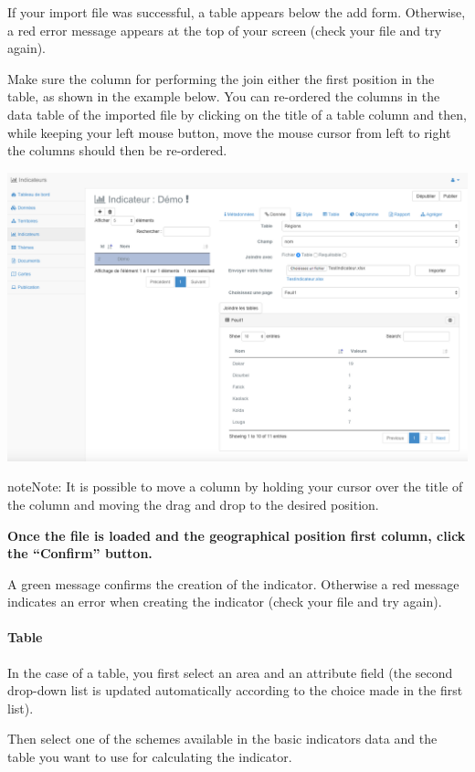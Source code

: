 \documentclass[letterpaper,10pt,english]{sphinxmanual}
\begin{document}
If your import file was successful, a table appears below the add form. Otherwise, a red error message appears at the top of your screen (check your file and try again).

Make sure the column for performing the join either the first position in the table, as shown in the example below. You can re-ordered the columns in the data table of the imported file by clicking on the title of a table column and then, while keeping your left mouse button, move the mouse cursor from left to right the columns should then be re-ordered.

\includegraphics[width=1.000\linewidth]{indicator-data-table.png}

\begin{notice}{note}{Note:}
It is possible to move a column by holding your cursor over the title of the column and moving the drag and drop to the desired position.
\end{notice}

\textbf{Once the file is loaded and the geographical position first column, click the ``Confirm'' button.}

A green message confirms the creation of the indicator. Otherwise a red message indicates an error when creating the indicator (check your file and try again).


\paragraph{Table}
\label{indicators/indicatorspanel:table}
In the case of a table, you first select an area and an attribute field (the second drop-down list is updated automatically according to the choice made in the first list).

Then select one of the schemes available in the basic indicators data and the table you want to use for calculating the indicator.
\end{document}
